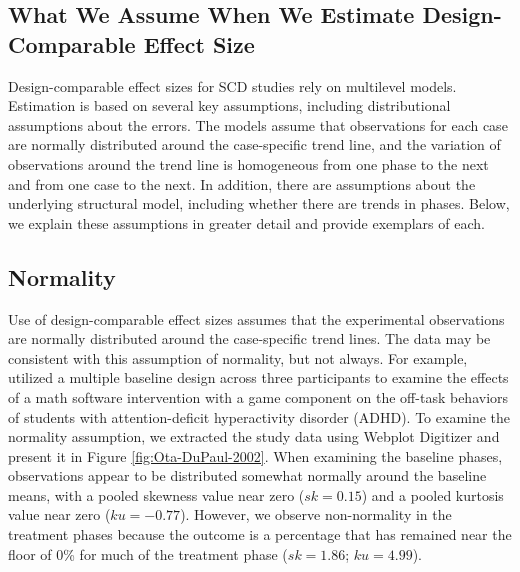 \documentclass[
]{book}
\begin{document}
\hypertarget{what-we-assume-when-we-estimate-design-comparable-effect-size}{%
\subsection{What We Assume When We Estimate Design-Comparable Effect Size}\label{what-we-assume-when-we-estimate-design-comparable-effect-size}}

Design-comparable effect sizes for SCD studies rely on multilevel models. Estimation is based on several key assumptions, including distributional assumptions about the errors. The models assume that observations for each case are normally distributed around the case-specific trend line, and the variation of observations around the trend line is homogeneous from one phase to the next and from one case to the next. In addition, there are assumptions about the underlying structural model, including whether there are trends in phases. Below, we explain these assumptions in greater detail and provide exemplars of each.

\hypertarget{normality}{%
\subsection{Normality}\label{normality}}

Use of design-comparable effect sizes assumes that the experimental observations are normally distributed around the case-specific trend lines. The data may be consistent with this assumption of normality, but not always. For example, \citet{ota2002Task} utilized a multiple baseline design across three participants to examine the effects of a math software intervention with a game component on the off-task behaviors of students with attention-deficit hyperactivity disorder (ADHD). To examine the normality assumption, we extracted the study data using Webplot Digitizer \citep{rohatgi2015Webplotdigitizer} and present it in Figure \ref{fig:Ota-DuPaul-2002}. When examining the baseline phases, observations appear to be distributed somewhat normally around the baseline means, with a pooled skewness value near zero (\(sk = 0.15\)) and a pooled kurtosis value near zero (\(ku = -0.77\)). However, we observe non-normality in the treatment phases because the outcome is a percentage that has remained near the floor of 0\% for much of the treatment phase (\(sk = 1.86\); \(ku = 4.99\)).
\end{document}
